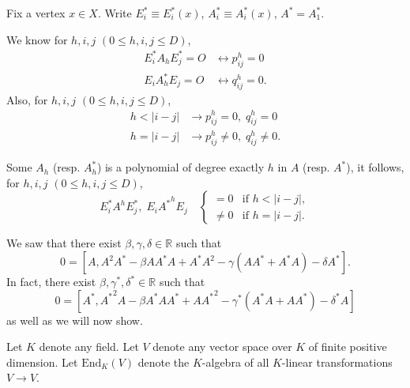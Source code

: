 \documentclass[
]{book}
\theoremstyle{definition}
\theoremstyle{definition}
\theoremstyle{definition}
\theoremstyle{definition}
\theoremstyle{remark}
\begin{document}
Fix a vertex \(x\in X\). Write \(E^*_i \equiv E^*_i(x)\), \(A^*_i \equiv A^*_i(x)\), \(A^* = A^*_1\).

We know for \(h, i, j\) \((0\leq h, i, j\leq D)\),
\begin{align}
E^*_iA_hE^*_j = O & \leftrightarrow p^h_{ij} = 0\\
E_iA_h^*E_j = O & \leftrightarrow q^h_{ij} = 0.
\end{align}
Also, for \(h, i, j\) \((0\leq h, i, j\leq D)\),
\begin{align}
h < |i-j| & \rightarrow p^h_{ij} = 0, \; q^h_{ij} = 0\\
h = |i-j| & \rightarrow p^h_{ij} \neq 0, \; q^h_{ij} \neq 0.
\end{align}

Some \(A_h\) (resp. \(A^*_h\)) is a polynomial of degree exactly \(h\) in \(A\) (resp. \(A^*\)), it follows, for \(h, i, j\) \((0\leq h, i, j\leq D)\),
\[E^*_iA^hE^*_j, \; E_i{A^*}^hE_j \quad \begin{cases} = 0 & \text{if } h < |i-j|,\\
\neq 0 & \text{if } h = |i-j|.\end{cases}\]

We saw that there exist \(\beta, \gamma, \delta\in \mathbb{R}\) such that
\[0 = [A, A^2A^*-\beta AA^*A + A^*A^2 - \gamma(AA^*+A^*A) - \delta A^*].\]
In fact, there exist \(\beta, \gamma^*, \delta^*\in \mathbb{R}\) such that
\[0 = [A^*, {A^*}^2A-\beta A^*AA^* + A{A^*}^2 - \gamma^*(A^*A+AA^*) - \delta^* A]\]
as well as we will now show.

Let \(K\) denote any field. Let \(V\) denote any vector space over \(K\) of finite positive dimension. Let \(\mathrm{End}_K(V)\) denote the \(K\)-algebra of all \(K\)-linear transformations \(V\to V\).
\end{document}
